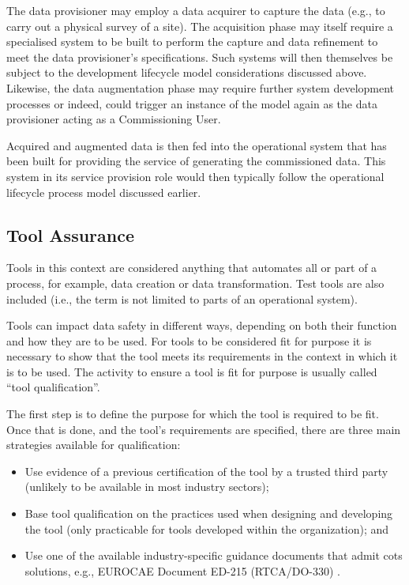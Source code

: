 The data provisioner may employ a data acquirer to capture the data (e.g., to carry out a physical survey of a site). The acquisition phase may itself require a specialised system to be built to perform the capture and data refinement to meet the data provisioner's specifications. Such systems will then themselves be subject to the development lifecycle model considerations discussed above. Likewise, the data augmentation phase may require further system development processes or indeed, could trigger an instance of the model again as the data provisioner acting as a Commissioning User.

Acquired and augmented data is then fed into the operational system that has been built for providing the service of generating the commissioned data. This system in its service provision role would then typically follow the operational lifecycle process model discussed earlier.

\subsection{Tool Assurance}
Tools in this context are considered anything that automates all or part of a process, for example, data creation or data transformation. Test tools are also included (i.e., the term is not limited to parts of an operational system).

Tools can impact data safety in different ways, depending on both their function and how they are to be used. For tools to be considered fit for purpose it is necessary to show that the tool meets its requirements in the context in which it is to be used. The activity to ensure a tool is fit for purpose is usually called ``tool qualification''.

The first step is to define the purpose for which the tool is required to be fit. Once that is done, and the tool's requirements are specified, there are three main strategies available for qualification:
\begin{itemize}
  \item Use evidence of a previous certification of the tool by a trusted third party (unlikely to be available in most industry sectors);
  \item Base tool qualification on the practices used when designing and developing the tool (only practicable for tools developed within the organization); and
  \item Use one of the available industry-specific guidance documents that admit \gls{cots} solutions, e.g., EUROCAE Document ED-215 (RTCA/DO-330) \cite{citation:ED215}.
\end{itemize}

